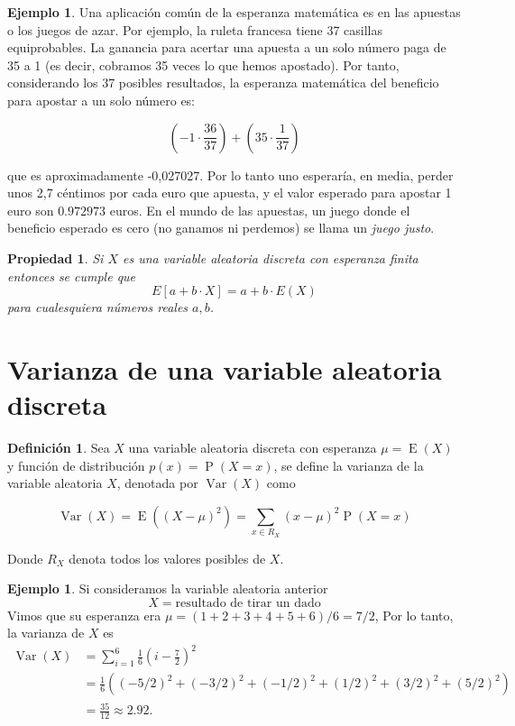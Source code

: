 \documentclass[]{book}
\theoremstyle{plain}
\newtheorem{property}[theorem]{Propiedad}
\theoremstyle{definition}
\newtheorem{definition}[theorem]{Definición}
\newtheorem{example}[theorem]{Ejemplo}
\theoremstyle{definition} %
\begin{document}
\begin{example}
  
Una aplicación común de la esperanza matemática es en las apuestas o los
juegos de azar. Por ejemplo, la ruleta francesa tiene 37 casillas
equiprobables. La ganancia para acertar una apuesta a un solo número
paga de 35 a 1 (es decir, cobramos 35 veces lo que hemos apostado). Por
tanto, considerando los 37 posibles resultados, la esperanza matemática
del beneficio para apostar a un solo número es:

\[\displaystyle \left(-1\cdot {\frac {36}{37}}\right)+\left(35\cdot {\frac {1}{37}}\right)\]

que es aproximadamente -0,027027. Por lo tanto uno esperaría, en media,
perder unos 2,7 céntimos por cada euro que apuesta, y el valor esperado
para apostar 1 euro son \(0.972973\) euros. En el mundo de las apuestas,
un juego donde el beneficio esperado es cero (no ganamos ni perdemos) se
llama un \emph{juego justo}.
\end{example}


\begin{property}
  Si $X$ es una variable aleatoria discreta con esperanza finita entonces se cumple que 
  \[E[a + b \cdot X] = a + b \cdot E(X)\] para cualesquiera números reales $a,b$.
\end{property}

\section{Varianza de una variable aleatoria
discreta}
\begin{definition}
  Sea \(X\) una variable aleatoria discreta con esperanza
\(\displaystyle \mu =\operatorname {E} (X)\) y función de distribución \(p(x) = \displaystyle \operatorname {P} (X=x)\), se define la varianza de
la variable aleatoria \(X\), denotada por
\(\displaystyle \operatorname {Var} (X)\) como

\[\displaystyle \operatorname {Var} (X)=\operatorname {E} ((X-\mu )^{2}) = \sum _{x\in R_{X}}(x-\mu )^{2}\operatorname {P} (X=x)\]

Donde \(R_X\) denota todos los valores posibles de \(X\).
\end{definition}

\begin{example}
  Si consideramos la variable aleatoria anterior 
  \[X=\text{resultado de tirar un dado}\]
  Vimos que su esperanza era $\mu =  (1+2+3+4+5+6)/6=7/2$, Por lo tanto, la varianza de $X$ es 
  \[
  \begin{aligned}\operatorname {Var} (X)&=\sum _{i=1}^{6}{\frac {1}{6}}\left(i-{\frac {7}{2}}\right)^{2}\\[5pt]&={\frac {1}{6}}\left((-5/2)^{2}+(-3/2)^{2}+(-1/2)^{2}+(1/2)^{2}+(3/2)^{2}+(5/2)^{2}\right)\\[5pt]&={\frac {35}{12}}\approx 2.92.\end{aligned}
  \]
\end{example}
\end{document}
